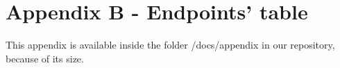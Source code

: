 \section*{Appendix B - Endpoints' table}
\label{app:endpoints_table}

This appendix is available inside the folder /docs/appendix in our repository, because of its size.
